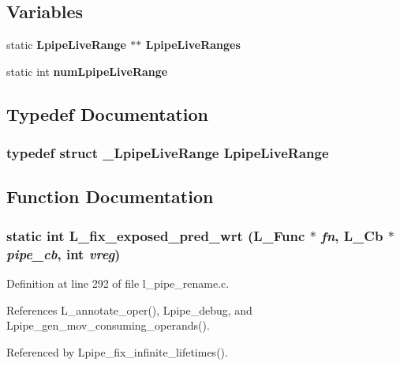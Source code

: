 \subsection*{Variables}
\begin{CompactItemize}
\item 
static \bf{Lpipe\-Live\-Range} $\ast$$\ast$ \bf{Lpipe\-Live\-Ranges}
\item 
static int \bf{num\-Lpipe\-Live\-Range}
\end{CompactItemize}


\subsection{Typedef Documentation}
\subsubsection{\setlength{\rightskip}{0pt plus 5cm}typedef struct \bf{\_\-Lpipe\-Live\-Range}  \bf{Lpipe\-Live\-Range}}\label{l__pipe__rename_8c_97ac298743960bdda8547bdccb09b0df}




\subsection{Function Documentation}
\subsubsection{\setlength{\rightskip}{0pt plus 5cm}static int L\_\-fix\_\-exposed\_\-pred\_\-wrt (L\_\-Func $\ast$ {\em fn}, L\_\-Cb $\ast$ {\em pipe\_\-cb}, int {\em vreg})\hspace{0.3cm}{\tt  [static]}}\label{l__pipe__rename_8c_98c8a789b7d50b4785825a65dfecb6e7}




Definition at line 292 of file l\_\-pipe\_\-rename.c.

References L\_\-annotate\_\-oper(), Lpipe\_\-debug, and Lpipe\_\-gen\_\-mov\_\-consuming\_\-operands().

Referenced by Lpipe\_\-fix\_\-infinite\_\-lifetimes().

